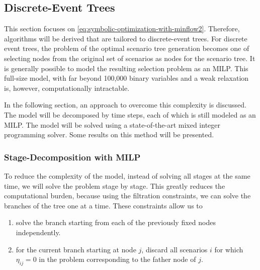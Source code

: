 \subsection{Discrete-Event Trees}
\label{sec:MILP-selection-problem}
This section focuses on \eqref{eq:symbolic-optimization-with-minflow2}.
Therefore, algorithms will be derived that are tailored to discrete-event trees.
For discrete event trees, the problem of the optimal scenario tree generation becomes one of selecting nodes from the original set of scenarios as nodes for the scenario tree.
It is generally possible to model the resulting selection problem as an MILP.
This full-size model, with far beyond 100,000 binary variables and a weak relaxation is, however, computationally intractable.

In the following section, an approach to overcome this complexity is discussed.
The model will be decomposed by time steps, each of which is still modeled as an MILP.
The model will be solved using a state-of-the-art mixed integer programming solver.
Some results on this method will be presented.
%
\subsubsection{Stage-Decomposition with MILP}
%
To reduce the complexity of the model, instead of solving all stages at the same time, we will solve the problem stage by stage.
This greatly reduces the computational burden, because using the filtration constraints, we can solve the branches of the tree one at a time.
These constraints allow us to
\begin{enumerate}
\item solve the branch starting from each of the previously fixed nodes independently.
\item for the current branch starting at node $j$, discard all scenarios $i$ for which $\eta_{ij}=0$ in the problem corresponding to the father node of $j$.
\end{enumerate}

